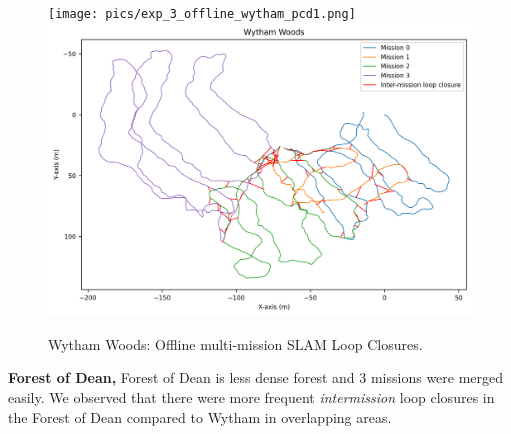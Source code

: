 \begin{figure}[htbp]
  \ContinuedFloat
  \centering
  \texttt{[image: pics/exp\_3\_offline\_wytham\_pcd1.png]}
  \includegraphics[width=\columnwidth]{pics/exp_3_1_multimission_slam_wytham.png}
  \caption{Wytham Woods: Offline multi-mission SLAM Loop Closures.}
  \label{fig:exp_multi_mission_wytham}
\end{figure}
\newline
\textbf{Forest of Dean, }\hspace{0.5em} Forest of Dean is less dense forest and 3 missions were merged easily. We observed that there were more frequent \emph{intermission} loop closures in the Forest of Dean compared to Wytham in overlapping areas. 
